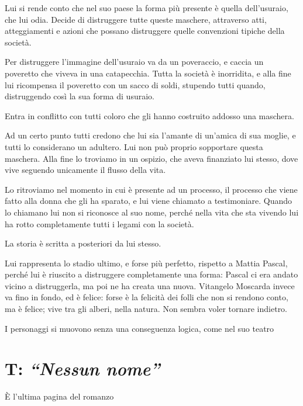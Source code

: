 Lui si rende conto che nel suo paese la forma più presente è quella dell’usuraio, che lui odia.
Decide di distruggere tutte queste maschere, attraverso atti, atteggiamenti e azioni che possano distruggere quelle convenzioni tipiche della società.

Per distruggere l’immagine dell’usuraio va da un poveraccio, e caccia un poveretto che viveva in una catapecchia. Tutta la società è inorridita, e alla fine lui ricompensa il poveretto con un sacco di soldi, stupendo tutti quando, distruggendo così la sua forma di usuraio.

Entra in conflitto con tutti coloro che gli hanno costruito addosso una maschera.

Ad un certo punto tutti credono che lui sia l’amante di un’amica di sua moglie, e tutti lo considerano un adultero. Lui non può proprio sopportare questa maschera.
Alla fine lo troviamo in un ospizio, che aveva finanziato lui stesso, dove vive seguendo unicamente il flusso della vita.

Lo ritroviamo nel momento in cui è presente ad un processo, il processo che viene fatto alla donna che gli ha sparato, e lui viene chiamato a testimoniare.
Quando lo chiamano lui non si riconosce al suo nome, perché nella vita che sta vivendo lui ha rotto completamente tutti i legami con la società.

La storia è scritta a posteriori da lui stesso.

Lui rappresenta lo stadio ultimo, e forse più perfetto, rispetto a Mattia Pascal, perché lui è riuscito a distruggere completamente una forma: Pascal ci era andato vicino a distruggerla, ma poi ne ha creata una nuova.
Vitangelo Moscarda invece va fino in fondo, ed è felice: forse è la felicità dei folli che non si rendono conto, ma è felice; vive tra gli alberi, nella natura.
Non sembra voler tornare indietro.

I personaggi si muovono senza una conseguenza logica, come nel suo teatro

\section{T: \textit{“Nessun nome”}}

È l’ultima pagina del romanzo



